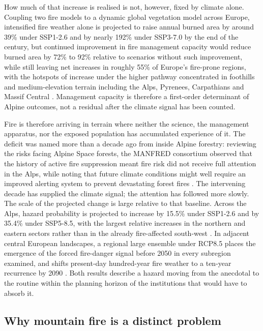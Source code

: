 \documentclass[11pt,a4paper]{article}
\begin{document}
How much of that increase is realised is not, however, fixed by climate alone. Coupling two fire models to a dynamic global vegetation model across Europe, intensified fire weather alone is projected to raise annual burned area by around 39\% under SSP1-2.6 and by nearly 192\% under SSP3-7.0 by the end of the century, but continued improvement in fire management capacity would reduce burned area by 72\% to 92\% relative to scenarios without such improvement, while still leaving net increases in roughly 55\% of Europe's fire-prone regions, with the hotspots of increase under the higher pathway concentrated in foothills and medium-elevation terrain including the Alps, Pyrenees, Carpathians and Massif Central \citep{billing_future_2026}. Management capacity is therefore a first-order determinant of Alpine outcomes, not a residual after the climate signal has been counted.

Fire is therefore arriving in terrain where neither the science, the management apparatus, nor the exposed population has accumulated experience of it. The deficit was named more than a decade ago from inside Alpine forestry: reviewing the risks facing Alpine Space forests, the MANFRED consortium observed that the history of active fire suppression meant fire risk did not receive full attention in the Alps, while noting that future climate conditions might well require an improved alerting system to prevent devastating forest fires \citep{jandl_management_2013}. The intervening decade has supplied the climate signal; the attention has followed more slowly. The scale of the projected change is large relative to that baseline. Across the Alps, hazard probability is projected to increase by 15.5\% under SSP1-2.6 and by 35.4\% under SSP5-8.5, with the largest relative increases in the northern and eastern sectors rather than in the already fire-affected south-west \citep{gerberding_mapping_2025}. In adjacent central European landscapes, a regional large ensemble under RCP8.5 places the emergence of the forced fire-danger signal before 2050 in every subregion examined, and shifts present-day hundred-year fire weather to a ten-year recurrence by 2090 \citep{miller_climate_2024}. Both results describe a hazard moving from the anecdotal to the routine within the planning horizon of the institutions that would have to absorb it.

\subsection{Why mountain fire is a distinct problem}
\end{document}
